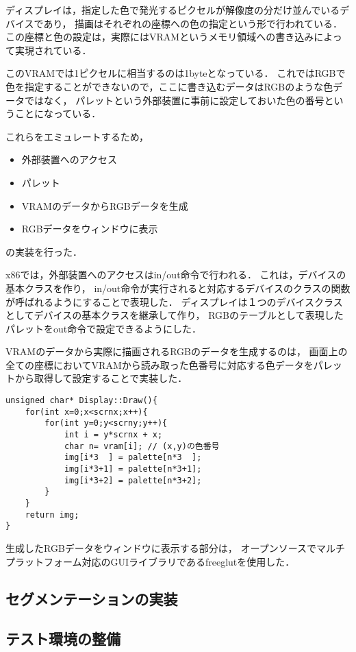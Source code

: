 \documentclass[10pt,a4j]{jsarticle}
\begin{document}
ディスプレイは，指定した色で発光するピクセルが解像度の分だけ並んでいるデバイスであり，
描画はそれぞれの座標への色の指定という形で行われている．
この座標と色の設定は，実際にはVRAMというメモリ領域への書き込みによって実現されている．

このVRAMでは1ピクセルに相当するのは1byteとなっている．
これではRGBで色を指定することができないので，ここに書き込むデータはRGBのような色データではなく，
パレットという外部装置に事前に設定しておいた色の番号ということになっている．

これらをエミュレートするため，
\begin{itemize}
	\item 外部装置へのアクセス
	\item パレット
	\item VRAMのデータからRGBデータを生成
	\item RGBデータをウィンドウに表示
\end{itemize}
の実装を行った．

x86では，外部装置へのアクセスはin/out命令で行われる．
これは，デバイスの基本クラスを作り，
in/out命令が実行されると対応するデバイスのクラスの関数が呼ばれるようにすることで表現した．
ディスプレイは１つのデバイスクラスとしてデバイスの基本クラスを継承して作り，
RGBのテーブルとして表現したパレットをout命令で設定できるようにした．

VRAMのデータから実際に描画されるRGBのデータを生成するのは，
画面上の全ての座標においてVRAMから読み取った色番号に対応する色データをパレットから取得して設定することで実装した．

\begin{lstlisting}
unsigned char* Display::Draw(){
	for(int x=0;x<scrnx;x++){
		for(int y=0;y<scrny;y++){
			int i = y*scrnx + x;
			char n= vram[i]; // (x,y)の色番号
			img[i*3  ] = palette[n*3  ];
			img[i*3+1] = palette[n*3+1];
			img[i*3+2] = palette[n*3+2];
		}
	}
	return img;
}
\end{lstlisting}

生成したRGBデータをウィンドウに表示する部分は，
オープンソースでマルチプラットフォーム対応のGUIライブラリであるfreeglutを使用した．

\subsection{セグメンテーションの実装\label{impl-segmentation}}

\subsection{テスト環境の整備\label{impl-test-env}}
\end{document}
